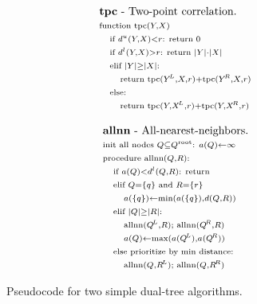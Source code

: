 \documentclass{article}
\newcommand{\disthrectmin}{d^{l}}
\newcommand{\disthrectmax}{d^{u}}
\newcommand{\dist}[2]{d(#1,#2)}
\newcommand{\kdroot}[1]{#1^{\text{\rm root}}}
\newcommand{\kdleft}[1]{#1^{\!L}}
\newcommand{\kdright}[1]{#1^{\!R}}
\newcommand{\X}{\\ \scriptstyle}
\newcommand{\x}{\\ \hspace{0.13in} \scriptstyle}
\newcommand{\xx}{\\ \hspace{0.26in} \scriptstyle}
\begin{document}
\begin{figure}
  \vspace{-1.89in}
  \hspace{1.8in}
  \begin{minipage}{3.88in}
    \begin{minipage}{1.8in}
      \begin{displaymath}
        \begin{array}{l}
          \text{{\bf tpc} - Two-point correlation.}
          \X \text{function tpc}(Y, X)
          \x \text{if }\disthrectmax(Y, X) < r\text{: return }0
          \x \text{if }\disthrectmin(Y, X) > r\text{: return } |Y| \cdot |X|
          \x \text{elif }|Y| \geq |X|\text{:}
          \xx \text{return tpc}(\kdleft{Y}, X, r) + \text{tpc}(\kdright{Y}, X, r)
          \x \text{else:}
          \xx \text{return tpc}(Y, \kdleft{X}, r) + \text{tpc}(Y, \kdright{X}, r)
        \end{array}
       \end{displaymath}
       \vspace{-.11in}
       \caption{\label{fig:allnntpc}\footnotesize Pseudocode for two simple dual-tree algorithms.}
      \end{minipage}
      \begin{minipage}{2.0in}
       \begin{displaymath}
        \begin{array}{l}
          \text{{\bf allnn} - All-nearest-neighbors.}
          \X \text{init all nodes }Q \subseteq \kdroot{Q}\text{: }a(Q) \gets \infty
          \X \text{procedure allnn}(Q,R)\text{:}
          \x \text{if }a(Q) < \disthrectmin(Q, R)\text{: return}
          \x \text{elif }Q = \{q\} \text{ and } R = \{r\}
          \xx a(\{q\}) \gets \min(a(\{q\}), \dist{Q}{R})
          \x \text{elif }|Q| \geq |R|\text{:}
          \xx \text{allnn}(\kdleft{Q}, R); \text{ allnn}(\kdright{Q}, R)
          \xx a(Q) \gets \max(a(\kdleft{Q}), a(\kdright{Q}))
          \x \text{else prioritize by min distance:}
          \xx \text{allnn}(Q, \kdleft{R}); \text{ allnn}(Q, \kdright{R})
          \\
        \end{array}
       \end{displaymath}
      \end{minipage}

\end{minipage}
\end{figure}
\end{document}
